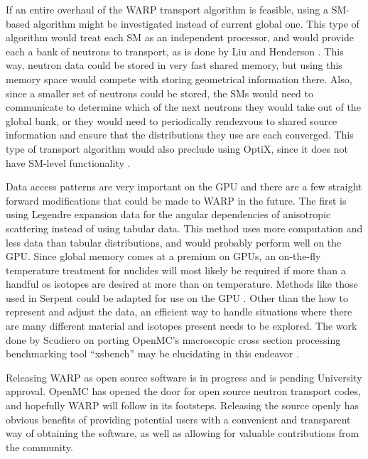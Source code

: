 If an entire overhaul of the WARP transport algorithm is feasible, using a SM-based algorithm might be investigated instead of current global one.  This type of algorithm would treat each SM as an independent processor, and would provide each a bank of neutrons to transport, as is done by Liu and Henderson \cite{tianyu,henderson}.   This way, neutron data could be stored in very fast shared memory, but using this memory space would compete with storing geometrical information there.  Also, since a smaller set of neutrons could be stored, the SMs would need to communicate to determine which of the next neutrons they would take out of the global bank, or they would need to periodically rendezvous to shared source information and ensure that the distributions they use are each converged.  This type of transport algorithm would also preclude using OptiX, since it does not have SM-level functionality \cite{optix}.

Data access patterns are very important on the GPU and there are a few straight forward modifications that could be made to WARP in the future.  The first is using Legendre expansion data for the angular dependencies of anisotropic scattering instead of using tabular data.  This method uses more computation and less data than tabular distributions, and would probably perform well on the GPU.  Since global memory comes at a premium on GPUs, an on-the-fly temperature treatment for nuclides will most likely be required if more than a handful os isotopes are desired at more than on temperature.  Methods like those used in Serpent could be adapted for use on the GPU \cite{serpent}.  Other than the how to represent and adjust the data, an efficient way to handle situations where there are many different material and isotopes present needs to be explored.  The work done by Scudiero on porting OpenMC's macroscopic cross section processing benchmarking tool ``xsbench'' may be elucidating in this endeavor \cite{openmc,scudiero}.

Releasing WARP as open source software is in progress and is pending University approval.  OpenMC has opened the door for open source neutron transport codes, and hopefully WARP will follow in its footsteps.  Releasing the source openly has obvious benefits of providing potential users with a convenient and transparent way of obtaining the software, as well as allowing for valuable contributions from the community.  






